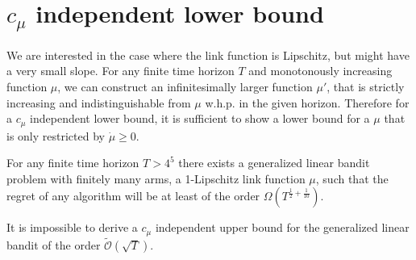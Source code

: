 \section{$c_{\mu}$ independent lower bound}
We are interested in the case where the link function is Lipschitz, but might have a very small slope. For any finite time horizon $T$ and monotonously increasing function $\mu$, we can construct an infinitesimally larger function $\mu'$, that is strictly increasing and indistinguishable from $\mu$ w.h.p. in the given horizon. Therefore for a $c_\mu$ independent lower bound, it is sufficient to show a lower bound for a $\mu$ that is only restricted by $\dot{\mu}\geq 0$.
\begin{theorem}
For any finite time horizon $T>4^5$ there exists a generalized linear bandit problem with finitely many arms, a 1-Lipschitz link function $\mu$, such that the regret of any algorithm will be at least of the order $\Omega(T^{\frac{1}{2}+\frac{1}{10}})$.
\end{theorem}
\begin{corollary}
It is impossible to derive a $c_\mu$ independent upper bound for the generalized linear bandit of the order $\tilde{\mathcal{O}}(\sqrt{T})$.
\end{corollary}
